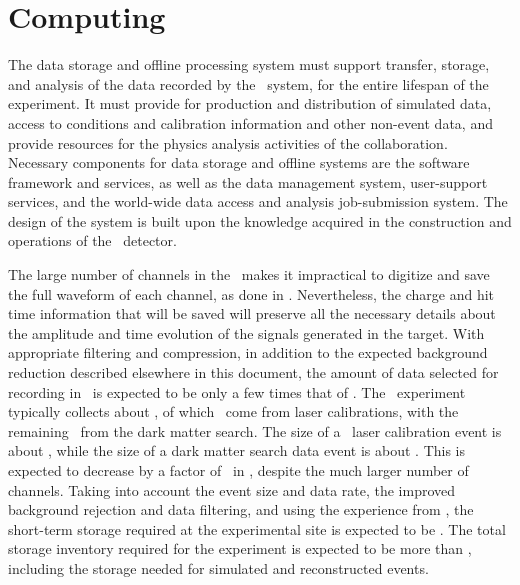 \section{Computing}
\label{sec:Computing}

The data storage and offline processing system must support transfer, storage, and analysis of the data recorded by the \DAQ\ system, for the entire lifespan of the experiment.  It must provide for production and distribution of simulated data, access to conditions and calibration information and other non-event data, and provide resources for the physics analysis activities of the collaboration. Necessary components for data storage and offline systems are the software framework and services, as well as the data management system, user-support services, and the world-wide data access and analysis job-submission system.  The design of the system is built upon the knowledge acquired in the construction and operations of the \DSfs\ detector. 

The large number of channels in the \LArTPC\ makes it impractical to digitize and save the full waveform of each channel, as done in \DSfs.  Nevertheless, the charge and hit time information that will be saved will preserve all the necessary details about the amplitude and time evolution of the signals generated in the target. With appropriate filtering and compression, in addition to the expected background reduction described elsewhere in this document, the amount of data selected for recording in \DSks\ is expected to be only a few times that of \DSfs.  The \DSfs\ experiment typically collects about \DSfDataTotalRate, of which \DSfDataLaserRate\ come from laser calibrations, with the remaining \DSfDataDMSRate\ from the dark matter search.  The size of a \DSfs\ laser calibration event is about \DSfDataLaserSize, while the size of a dark matter search data event is about \DSfDataDMSSize.  This is expected to decrease by a factor of \DSkDSfDataReductionFactor\ in \DSks, despite the much larger number of channels.  Taking into account the event size and data rate, the improved background rejection and data filtering, and using the experience from \DSfs, the short-term storage required at the experimental site is expected to be \DSkDataStorageLNGSShortDisk.  The total storage inventory required for the experiment is expected to be more than \DSkDataStorageTotalDiskNewProposalExtended, including the storage needed for simulated and reconstructed events. 


